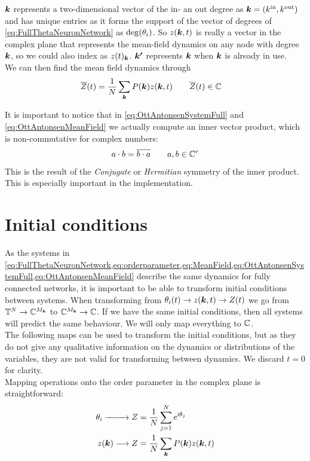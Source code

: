 ${\boldsymbol{k}}$ represents a two-dimensional vector of the in- an out degree as ${\boldsymbol{k}} = ( {k^{\rm in}}, {k^{\rm out}})$ and has unique entries as it forms the support of the vector of degrees of \eqref{eq:FullThetaNeuronNetwork} as ${\rm deg}(\theta_i)$. So $z({\boldsymbol{k}},t)$ is really a vector in the complex plane that represents the mean-field dynamics on any node with degree ${\boldsymbol{k}}$, so we could also index as $z(t)_{{\boldsymbol{k}}}$. ${\boldsymbol{k'}}$ represents ${\boldsymbol{k}}$ when ${\boldsymbol{k}}$ is already in use.\\

We can then find the mean field dynamics through
\begin{align}
\overline{Z}(t) &= \frac{1}{N} \sum_{{\boldsymbol{k}}} P({\boldsymbol{k}}) z({\boldsymbol{k}}, t) \qquad \overline{Z}(t) \in {\mathbb{C}} \label{eq:OttAntonsenMeanField}
\end{align}

It is important to notice that in \eqref{eq:OttAntonsenSystemFull} and \eqref{eq:OttAntonsenMeanField} we actually compute an inner vector product, which is non-commutative for complex numbers:
\begin{align}
a \cdot b = \overline{b \cdot a} \qquad a, b \in {\mathbb{C}}^r
\end{align}
This is the result of the \textsl{Conjugate} or \textsl{Hermitian} symmetry of the inner product. This is especially important in the \matlab implementation.


\section{Initial conditions}
As the systems in \cref{eq:FullThetaNeuronNetwork,eq:orderparameter,eq:MeanField,eq:OttAntonsenSystemFull,eq:OttAntonsenMeanField} describe the same dynamics for fully connected networks, it is important to be able to transform initial conditions between systems. When transforming from $\theta_i(t) \rightarrow z({\boldsymbol{k}},t) \rightarrow Z(t)$ we go from ${\mathbb{T}}^N \rightarrow {\mathbb{C}}^{M_{\boldsymbol{k}}}$ to ${\mathbb{C}}^{M_{\boldsymbol{k}}} \rightarrow {\mathbb{C}}$. If we have the same initial conditions, then all systems will predict the same behaviour. We will only map everything to ${\mathbb{C}}$.\\
The following maps can be used to transform the initial conditions, but as they do not give any qualitative information on the dynamics or distributions of the variables, they are not valid for transforming between dynamics. We discard $t=0$ for clarity. \\
Mapping operations onto the order parameter in the complex plane is straightforward:
\begin{align*}
\theta_i \xrightarrow{\hspace*{8mm}} Z &= \frac{1}{N} \sum_{j=1}^N e^{{\rm{i}}\theta_j} \\
z({\boldsymbol{k}}) \longrightarrow Z &= \frac{1}{N} \sum_{{\boldsymbol{k}}} P({\boldsymbol{k}}) z({\boldsymbol{k}}, t)
\end{align*}

